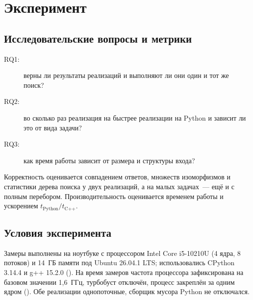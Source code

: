 
\section{Эксперимент}
\label{sec:experiment}

\subsection{Исследовательские вопросы и метрики}

\begin{description}
    \item[RQ1:] верны ли результаты реализаций и выполняют ли они один и тот же поиск?
    \item[RQ2:] во сколько раз реализация на \Cpp{} быстрее реализации на Python и зависит ли это от вида задачи?
    \item[RQ3:] как время работы \ISOMn{} зависит от размера и структуры входа?
\end{description}
Корректность оценивается совпадением ответов, множеств изоморфизмов и статистики дерева поиска у двух реализаций, а на малых задачах~--- ещё и с полным перебором.
Производительность оценивается временем работы и ускорением $t_{\text{Python}} / t_{\text{C++}}$.

\subsection{Условия эксперимента}
\label{subsec:conditions}

Замеры выполнены на ноутбуке с процессором Intel Core i5-10210U (4 ядра, 8 потоков) и 14~ГБ памяти под Ubuntu 26.04.1 LTS; использовались CPython 3.14.4 и g++ 15.2.0 ().
На время замеров частота процессора зафиксирована на базовом значении 1,6~ГГц, турбобуст отключён, процесс закреплён за одним ядром ().
Обе реализации однопоточные, сборщик мусора Python не отключался.

